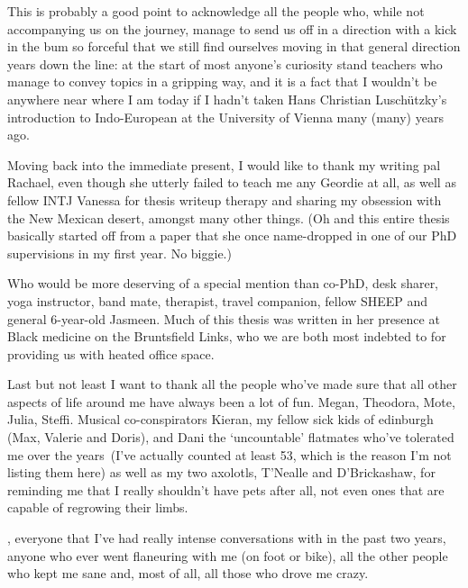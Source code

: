 \documentclass[oneside]{book}
\begin{document}
This is probably a good point to acknowledge all the people who, while not accompanying us on the journey, manage to send us off in a direction with a kick in the bum so forceful that we still find ourselves moving in that general direction years down the line: at the start of most anyone's curiosity stand teachers who manage to convey topics in a gripping way, and it is a fact that I wouldn't be anywhere near where I am today if I hadn't taken Hans Christian Luschützky's introduction to Indo-European at the University of Vienna many (many) years ago. %

Moving back into the immediate present, I would like to thank my writing pal Rachael, even though she utterly failed to teach me any Geordie at all, as well as fellow INTJ Vanessa for thesis writeup therapy and sharing my obsession with the New Mexican desert, amongst many other things. (Oh and this entire thesis basically started off from a paper that she once name-dropped in one of our PhD supervisions in my first year. No biggie.)

Who would be more deserving of a special mention than co-PhD, desk sharer, yoga instructor, band mate, therapist, travel companion, fellow SHEEP and general 6-year-old Jasmeen. Much of this thesis was written in her presence at Black medicine on the Bruntsfield Links, who we are both most indebted to for providing us with heated office space.

Last but not least I want to thank all the people who've made sure that all other aspects of life around me have always been a lot of fun. Megan, Theodora, Mote, Julia, Steffi.
Musical co-conspirators Kieran, my fellow sick kids of edinburgh (Max, Valerie and Doris), and Dani %
the `uncountable' flatmates who've tolerated me over the years~(I've actually counted at least 53, which is the reason I'm not listing them here) as well as my two axolotls, T'Nealle and D'Brickashaw, for reminding me that I really shouldn't have pets after all, not even ones that are capable of regrowing their limbs.

, everyone that I've had really intense conversations with in the past two years, anyone who ever went flaneuring with me (on foot or bike), all the other people who kept me sane and, most of all, all those who drove me crazy.

\tableofcontents
\end{document}
